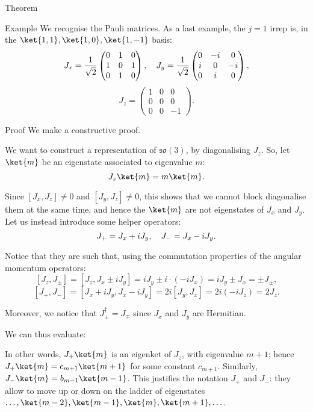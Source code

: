 \documentclass[a4paper]{article}
\begin{document}
\begin{parag}{Theorem}
\begin{subparag}{Example}
        We recognise the Pauli matrices. As a last example, the $j = 1$ irrep is, in the $\ket{1, 1}, \ket{1, 0}, \ket{1, -1}$ basis: 
        \[J_x = \frac{1}{\sqrt{2}} \begin{pmatrix} 0 & 1 & 0 \\ 1 & 0 & 1 \\ 0 & 1 & 0 \end{pmatrix}, \quad J_y = \frac{1}{\sqrt{2}} \begin{pmatrix} 0 & -i & 0 \\ i & 0 & -i \\ 0 & i & 0 \end{pmatrix},\]
        \[J_z = \begin{pmatrix} 1 & 0 & 0 \\ 0 & 0 & 0 \\ 0 & 0 & -1 \end{pmatrix}.\]
    \end{subparag}

    \begin{subparag}{Proof}
        We make a constructive proof.

        We want to construct a representation of $\mathfrak{so}\left(3\right)$, by diagonalising $J_z$. So, let $\ket{m}$ be an eigenstate associated to eigenvalue $m$: 
        \[J_z \ket{m} = m \ket{m}.\]

        Since $\left[J_x, J_z\right] \neq 0$ and $\left[J_y, J_z\right] \neq 0$, this shows that we cannot block diagonalise them at the same time, and hence the $\ket{m}$ are not eigenstates of $J_x$ and $J_y$. Let us instead introduce some helper operators: 
        \[J_+ = J_x + i J_y, \quad J_- = J_x - i J_y.\]
        
        Notice that they are such that, using the commutation properties of the angular momentum operators: 
        \[\left[J_z, J_{\pm}\right] = \left[J_z, J_x \pm i J_y\right] = iJ_y \pm i\cdot \left(-i J_x\right) = i J_y \pm J_x = \pm J_{\pm},\]
        \[\left[J_+, J_-\right] = \left[J_x + i J_y, J_x - i J_y\right] = 2i \left[J_y, J_x\right] = 2i\left(-i J_z\right) = 2 J_z.\]

        Moreover, we notice that $J_{\pm}^{\dagger} = J_{\mp}$ since $J_x$ and $J_y$ are Hermitian. 

        We can thus evaluate: 

        In other words, $J_+\ket{m}$ is an eigenket of $J_z$, with eigenvalue $m + 1$; hence $J_+ \ket{m} = c_{m+1}\ket{m+1}$ for some constant $c_{m+1}$. Similarly, $J_- \ket{m} = b_{m-1} \ket{m - 1}$. This justifies the notation $J_+$ and $J_-$: they allow to move up or down on the ladder of eigenstates $\ldots, \ket{m-2}, \ket{m-1}, \ket{m}, \ket{m+1}, \ldots$.


\end{subparag}
\end{parag}
\end{document}
